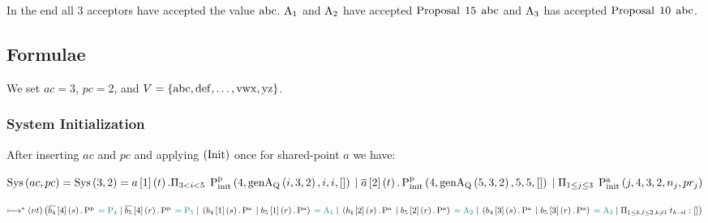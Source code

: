 In the end all $3$ acceptors have accepted the value $\ABC$.
$\Acceptor{1}$ and $\Acceptor{2}$ have accepted $\ProposalC{15}{\ABC}$ and $\Acceptor{3}$ has accepted $\ProposalC{10}{\ABC}$.

\subsection{Formulae}
We set $ac = 3$, $pc = 2$, and $V=\Curly{\ABC, \operatorname{def}, \dots, \operatorname{vwx}, \operatorname{yz}}$.

\subsubsection{System Initialization}
After inserting $ac$ and $pc$ and applying $\Init$ once for shared-point $a$ we have:

$\Sys{ac}{pc} = \Sys{3}{2} =
\SessionAccept{a}{1}{t}.\ParallelFor{3 < i < 5} \PpInit{4}{\genAq{i}{3}{2}}{i}{i}{[]}\\
\Or \SessionRequest{a}{2}{t}.\PpInit{4}{\genAq{5}{3}{2}}{5}{5}{[]}\\
\Or \ParallelFor{1 \le j \le 3} \PaInit{j}{4}{3}{2}{n_j}{pr_j}$



$\mapstostar
\Nu{t}\big (
\SessionRequest{b_4}{4}{s}.\Pp \comment{= \Proposer{4}}\\
\Or \SessionRequest{b_5}{4}{r}.\Pp \comment{= \Proposer{5}}\\
\Or \Paren{\SessionAccept{b_4}{1}{s}.\Pa \Or \SessionAccept{b_5}{1}{r}.\Pa} \comment{= \Acceptor{1}}\\
\Or \Paren{\SessionAccept{b_4}{2}{s}.\Pa \Or \SessionAccept{b_5}{2}{r}.\Pa} \comment{= \Acceptor{2}}\\
\Or \Paren{\SessionAccept{b_4}{3}{s}.\Pa \Or \SessionAccept{b_5}{3}{r}.\Pa} \comment{= \Acceptor{3}}\\
\Or \OuterSessionQueues
\big )$

